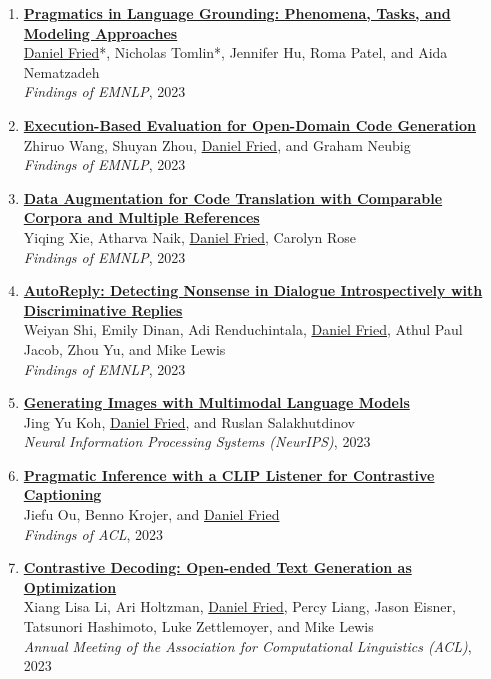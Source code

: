 \begin{enumerate}[leftmargin=-1mm,partopsep=0pt]
\item \href{https://arxiv.org/abs/2211.08371}{\textbf{Pragmatics in Language Grounding: Phenomena, Tasks, and Modeling Approaches}} \\
  \underline{Daniel Fried}*, Nicholas Tomlin*, Jennifer Hu, Roma Patel, and Aida Nematzadeh\\
  \emph{Findings of EMNLP}, 2023

\item \href{https://arxiv.org/abs/2212.10481}{\textbf{Execution-Based Evaluation for Open-Domain Code Generation}} \\
  Zhiruo Wang, Shuyan Zhou, \underline{Daniel Fried}, and Graham Neubig\\
  \emph{Findings of EMNLP}, 2023

\item \href{https://arxiv.org/abs/2311.00317}{\textbf{Data Augmentation for Code Translation with Comparable Corpora and Multiple References}} \\
  Yiqing Xie, Atharva Naik, \underline{Daniel Fried}, Carolyn Rose\\
  \emph{Findings of EMNLP}, 2023

\item \href{https://arxiv.org/abs/2211.12615}{\textbf{AutoReply: Detecting Nonsense in Dialogue Introspectively with Discriminative Replies}} \\
  Weiyan Shi, Emily Dinan, Adi Renduchintala, \underline{Daniel Fried}, Athul Paul Jacob, Zhou Yu, and Mike Lewis\\
  \emph{Findings of EMNLP}, 2023

\item \href{https://arxiv.org/abs/2305.17216}{\textbf{Generating Images with Multimodal Language Models}} \\
  Jing Yu Koh, \underline{Daniel Fried}, and Ruslan Salakhutdinov\\
  \emph{Neural Information Processing Systems (NeurIPS)}, 2023

\item \href{https://arxiv.org/abs/2306.08818}{\textbf{Pragmatic Inference with a CLIP Listener for Contrastive Captioning}} \\
  Jiefu Ou, Benno Krojer, and \underline{Daniel Fried}\\
  \emph{Findings of ACL}, 2023

\item \href{https://arxiv.org/abs/2210.15097}{\textbf{Contrastive Decoding: Open-ended Text Generation as Optimization}} \\
  Xiang Lisa Li, Ari Holtzman, \underline{Daniel Fried}, Percy Liang, Jason Eisner, Tatsunori Hashimoto, Luke Zettlemoyer, and Mike Lewis\\
  \emph{Annual Meeting of the Association for Computational Linguistics (ACL)}, 2023


\end{enumerate}
